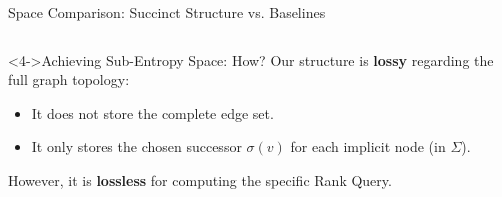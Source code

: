 \begin{frame}{Space Comparison: Succinct Structure vs. Baselines}
\begin{columns}[c]
\begin{column}{0.5\textwidth}
            \begin{alertblock}<4->{Achieving Sub-Entropy Space: How?}
                Our structure is \textbf{lossy} regarding the full graph topology:
                \begin{itemize}
                    \item It \alert{does not store} the complete edge set.
                    \item It only stores the chosen successor $\sigma(v)$ for each implicit node (in $\Sigma$).
                \end{itemize}
                However, it is \textbf{lossless} for computing the specific \alert{Rank Query}.
            \end{alertblock}
        \end{column}
    \end{columns}
\end{frame}









